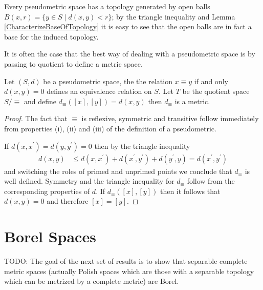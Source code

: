 Every pseudometric space has a topology generated
by open balls $B(x,r) = \lbrace y \in S \mid d(x,y) < r \rbrace$; by the triangle inequality
and Lemma \ref{CharacterizeBaseOfTopology} it is easy to see that the open balls are in fact
a base for the induced topology.

It is often the case that the best way of dealing with a pseudometric space is by passing to quotient to define a metric space.
\begin{prop}\label{QuotientOfPseudometricSpace}Let $(S,d)$ be a pseudometric space, the the relation $x \equiv y$ if and only $d(x,y) = 0$ defines an equivalence
relation on $S$.  Let $T$ be the quotient space $S/\equiv$ and define $d_{\equiv}([x], [y]) = d(x,y)$ then $d_\equiv$ is a metric.
\end{prop}
\begin{proof}
The fact that $\equiv$ is reflexive, symmetric and transitive follow immediately from properties (i), (ii) and (iii) of the definition of a pseudometric.

If $d(x,x^\prime) = d(y,y^\prime) = 0$ then by the triangle inequality
\begin{align*}
d(x,y) &\leq d(x, x^\prime) + d(x^\prime, y^\prime) + d(y^\prime, y) = d(x^\prime, y^\prime)
\end{align*}
and switching the roles of primed and unprimed points we conclude that $d_\equiv$ is well defined.  Symmetry and the triangle inequality for $d_\equiv$ follow from
the corresponding properties of $d$.  If $d_\equiv([x], [y])$ then it follows that $d(x,y) = 0$ and therefore $[x]=[y]$.
\end{proof}

\section{Borel Spaces}

TODO: The goal of the next set of results is to show that separable
complete metric spaces (actually Polish spaces which are those with
a separable topology which can be metrized by a complete metric) are Borel.


